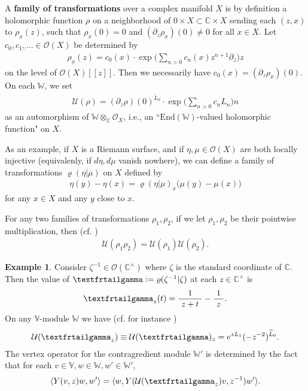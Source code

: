 \documentclass[11pt,b5paper,notitlepage]{article}
\theoremstyle{definition}
\newtheorem{eg}[df]{Example}
\theoremstyle{plain}
\newcommand{\mc}{\mathcal}
\newcommand{\wtd}{\widetilde}
\newcommand{\End}{\mathrm{End}} %
\newcommand{\bk}[1]{\langle {#1}\rangle}
\newcommand{\scr}{\mathscr}
\newcommand{\Vbb}{\mathbb V}
\newcommand{\Wbb}{\mathbb W}
\newcommand{\Cbb}{\mathbb C}
\newcommand{\tipxgamma}{\text{\textfrtailgamma}}
\numberwithin{equation}{subsection}
\begin{document}
A \textbf{family of transformations} over a complex manifold $X$ is by definition a holomorphic function $\rho$ on a neighborhood of $0\times X\subset \Cbb\times X$ sending each $(z,x)$ to $\rho_x(z)$, such that $\rho_x(0)=0$ and $(\partial_z\rho_x)(0)\neq 0$ for all $x\in X$. Let $c_0,c_1,\dots\in\scr O(X)$ be determined by
\begin{align*}
	\rho_x(z)=c_0(x)\cdot\exp\Big(\sum_{n>0}c_n(x)z^{n+1}\partial_z\Big)z
\end{align*}
on the level of $\scr O(X)[[z]]$. Then we necessarily have $c_0(x)=(\partial_z\rho_x)(0)$. On each $\Wbb$,   we set \index{U@$\mc U(\rho)$}
\begin{align*}
	\mc U(\rho)=(\partial_z\rho)(0)^{\wtd L_0}\cdot\exp\Big(\sum_{n>0}c_nL_n\Big)n
\end{align*}
as an automorphism of $\Wbb\otimes_\Cbb\scr O_X$, i.e., an ``$\End(\Wbb)$-valued holomorphic function" on $X$.


As an example, if $X$ is a Riemann surface, and if $\eta,\mu\in\scr O(X)$ are both locally injective (equivalenly, if $d\eta,d\mu$ vanish nowhere), we can define a family of transformations $\varrho(\eta|\mu)$  on $X$ defined by
\begin{align}
\eta(y)-\eta(x)=\varrho(\eta|\mu)_x\Big(\mu(y)-\mu(x)\Big)	
\end{align}
for any $x\in X$ and any $y$ close to $x$.

For any two families of transformations $\rho_1,\rho_2$, if we let $\rho_1,\rho_2$ be their pointwise multiplication, then (cf. \cite[Sec. 4.2]{Hua97})
\begin{align*}
\mc U(\rho_1\rho_2)=\mc U(\rho_1)\mc U(\rho_2).	
\end{align*}

\begin{eg}\label{lb36}
Consider $\zeta^{-1}\in\scr O(\Cbb^\times)$ where $\zeta$ is the standard coordinate of $\Cbb$. Then the value of $\tipxgamma:=\varrho(\zeta^{-1}|\zeta)$ at each $z\in\Cbb^\times$ is \index{zz@$\tipxgamma$}
\begin{align*}
\tipxgamma_z(t)=\frac 1{~z+t~}-\frac 1{~z~}.	
\end{align*}
On any $\Vbb$-module $\Wbb$ we have (cf. for instance \cite[Ex. 1.4]{Gui24a})
\begin{align}
\mc U(\tipxgamma_z)\equiv\mc U(\tipxgamma)_z=e^{z L_1}(-z^{-2})^{\wtd L_0}.	
\end{align}
The vertex operator for the contragredient module $\Wbb'$ is determined by the fact that for each $v\in\Vbb,w\in\Wbb,w'\in\Wbb'$,
\begin{align*}
\bk{Y(v,z)w,w'}=\bk{w,Y(\mc U(\tipxgamma_z)v,z^{-1})w'}.
\end{align*}
\end{eg}
\end{document}

